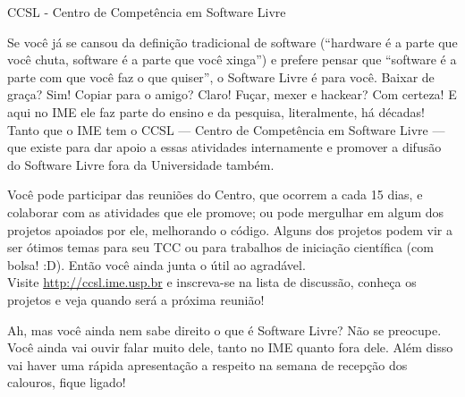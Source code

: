 \begin{secao}{CCSL - Centro de Competência em Software Livre}

Se você já se cansou da definição tradicional de software (``hardware é a parte
que você chuta, software é a parte que você xinga'') e prefere pensar que
``software é a parte com que você faz o que quiser'', o Software Livre é para você. 
Baixar de graça? Sim! Copiar para o amigo? Claro! Fuçar, mexer e hackear? Com
 certeza! E aqui no IME ele faz parte do ensino e da pesquisa, literalmente, há
 décadas! Tanto que o IME tem o CCSL --- Centro de Competência em Software Livre
 --- que existe para dar apoio a essas atividades internamente e promover a
 difusão do Software Livre fora da Universidade também.

Você pode participar das reuniões do Centro, que ocorrem a cada 15 dias, e
 colaborar com as atividades que ele promove; ou pode mergulhar em algum dos
 projetos apoiados por ele, melhorando o código. Alguns dos projetos podem vir a
 ser ótimos temas para seu TCC ou para trabalhos de iniciação científica (com
 bolsa! :D). Então você ainda junta o útil ao agradável.\\
Visite \url{http://ccsl.ime.usp.br} e inscreva-se na lista de discussão,
 conheça os projetos e veja quando será a próxima reunião!

Ah, mas você ainda nem sabe direito o que é Software Livre? Não se preocupe.
 Você ainda vai ouvir falar muito dele, tanto no IME quanto fora dele. Além disso vai
 haver uma rápida apresentação a respeito na semana de recepção dos calouros, fique ligado!

\end{secao}
